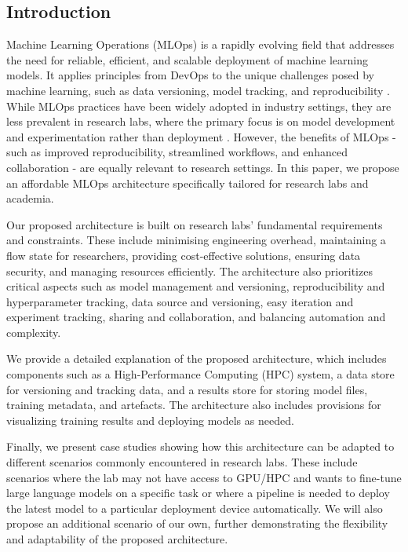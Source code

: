 \subsection{Introduction \label{introduction}}

Machine Learning Operations (MLOps) is a rapidly evolving field that addresses the need for reliable, efficient, and scalable deployment of machine learning models. It applies principles from DevOps to the unique challenges posed by machine learning, such as data versioning, model tracking, and reproducibility \cite{kreuzberger2023machine}. While MLOps practices have been widely adopted in industry settings, they are less prevalent in research labs, where the primary focus is on model development and experimentation rather than deployment \cite{hewage2022machine}. However, the benefits of MLOps - such as improved reproducibility, streamlined workflows, and enhanced collaboration - are equally relevant to research settings. In this paper, we propose an affordable MLOps architecture specifically tailored for research labs and academia.


Our proposed architecture is built on research labs' fundamental requirements and constraints. These include minimising engineering overhead, maintaining a flow state for researchers, providing cost-effective solutions, ensuring data security, and managing resources efficiently. The architecture also prioritizes critical aspects such as model management and versioning, reproducibility and hyperparameter tracking, data source and versioning, easy iteration and experiment tracking, sharing and collaboration, and balancing automation and complexity.

We provide a detailed explanation of the proposed architecture, which includes components such as a High-Performance Computing (HPC) system, a data store for versioning and tracking data, and a results store for storing model files, training metadata, and artefacts. The architecture also includes provisions for visualizing training results and deploying models as needed.


Finally, we present case studies showing how this architecture can be adapted to different scenarios commonly encountered in research labs. These include scenarios where the lab may not have access to GPU/HPC and wants to fine-tune large language models on a specific task or where a pipeline is needed to deploy the latest model to a particular deployment device automatically. We will also propose an additional scenario of our own, further demonstrating the flexibility and adaptability of the proposed architecture.

